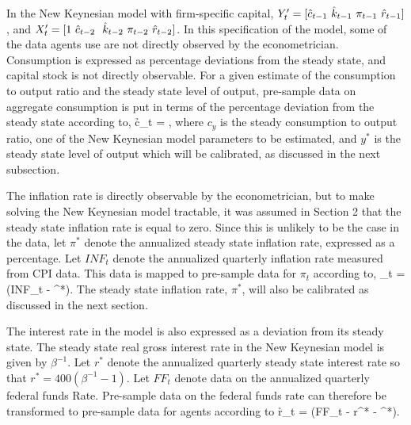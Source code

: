 In the New Keynesian model with firm-specific capital, $Y_t' = [\hat{c}_{t-1}~ \hat{k}_{t-1}~ \pi_{t-1}~ \hat{r}_{t-1}]$, and $X_t' = [1~ \hat{c}_{t-2}~ ~\hat{k}_{t-2}~ \pi_{t-2}~ \hat{r}_{t-2}]$.  In this specification of the model, some of the data agents use are not directly observed by the econometrician.  Consumption is expressed as percentage deviations from the steady state, and capital stock is not directly observable.  For a given estimate of the consumption to output ratio and the steady state level of output, pre-sample data on aggregate consumption is put in terms of the percentage deviation from the steady state according to,
\beq \label{eq2:cinit} \h{c}_t = , \eeq
where $c_y$ is the steady consumption to output ratio, one of the New Keynesian model parameters to be estimated, and $y^*$ is the steady state level of output which will be calibrated, as discussed in the next subsection.

The inflation rate is directly observable by the econometrician, but to make solving the New Keynesian model tractable, it was assumed in Section 2 that the steady state inflation rate is equal to zero.  Since this is unlikely to be the case in the data, let $\pi^*$ denote the annualized steady state inflation rate, expressed as a percentage.  Let $INF_t$ denote the annualized quarterly inflation rate measured from CPI data.  This data is mapped to pre-sample data for $\pi_t$ according to,
\beq \label{eq2:piinit} \pi_t = \left(INF_t - \pi^*\right). \eeq
The steady state inflation rate, $\pi^*$, will also be calibrated as discussed in the next section.

The interest rate in the model is also expressed as a deviation from its steady state.  The steady state real gross interest rate in the New Keynesian model is given by $\beta^{-1}$.  Let $r^*$ denote the annualized quarterly steady state interest rate so that $r^*=400(\beta^{-1}-1)$.  Let $FF_t$ denote data on the annualized quarterly federal funds Rate.  Pre-sample data on the federal funds rate can therefore be transformed to pre-sample data for agents according to
\beq \label{eq2:rinit} \h{r}_t = \left(FF_t - r^* - \pi^*\right). \eeq

